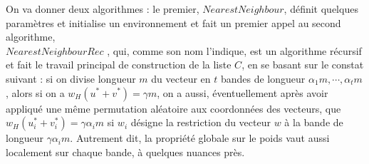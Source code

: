 \documentclass[12pt,openany]{report}
\begin{document}
On va donner deux algorithmes : le premier, $NearestNeighbour$, définit
quelques paramètres et initialise un environnement et fait un premier appel
au second algorithme, \\ $ NearestNeighbourRec $ , qui, comme son nom l’indique,
est un algorithme récursif et fait le travail principal de construction de la liste
$ \mathit{C} $, en se basant sur le constat suivant : si on divise longueur $m$ du vecteur en $t$ bandes de longueur  $\alpha_1 m,\cdots, \alpha_t m $, alors si on a $ w_H({u^{*}}+ {v^{*}}) = \gamma m$, on a
aussi, éventuellement après avoir appliqué une même permutation aléatoire aux
coordonnées des vecteurs, que $ w_H({u^{*}_i }+ {v^{*}_i }) = \gamma \alpha_i m$ si $w_i$ désigne la restriction
du vecteur $w$ à la bande de longueur $\gamma \alpha_i m $. Autrement dit, la propriété globale
sur le poids vaut aussi localement sur chaque bande, à quelques nuances près.
\end{document}

